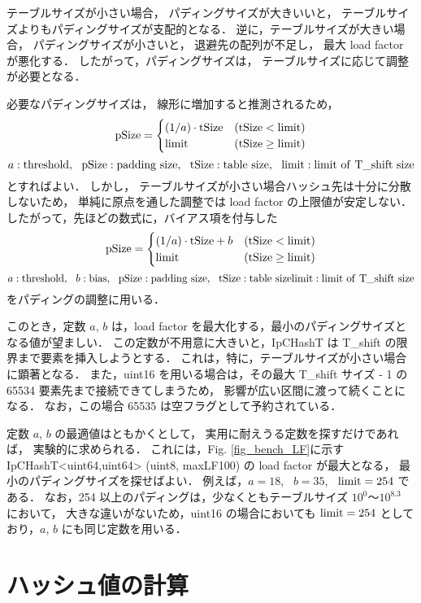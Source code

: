 テーブルサイズが小さい場合，
パディングサイズが大きいいと，
テーブルサイズよりもパディングサイズが支配的となる．
逆に，テーブルサイズが大きい場合，
パディングサイズが小さいと，
退避先の配列が不足し，
最大 load factor が悪化する．
したがって，パディングサイズは，
テーブルサイズに応じて調整が必要となる．

必要なパディングサイズは，
線形に増加すると推測されるため，
\[
  {\rm pSize} = \begin{cases}
    (1/a) \cdot {\rm tSize} & ({\rm tSize}<{\rm limit}) \\
    {\rm limit}    & ({\rm tSize}\geq{\rm limit})
  \end{cases}
\]
\[
  a: {\rm threshold}, \ \ 
  {\rm pSize}: {\rm padding \ size}, \ \ 
  {\rm tSize}: {\rm table \ size}, \ \ 
  {\rm limit}: {\rm limit \ of \ T\_shift \ size}
\]
とすればよい．
しかし，
テーブルサイズが小さい場合ハッシュ先は十分に分散しないため，
単純に原点を通した調整では load factor の上限値が安定しない．
したがって，先ほどの数式に，バイアス項を付与した
\[
  {\rm pSize} = \begin{cases}
    (1/a) \cdot {\rm tSize} + b & ({\rm tSize}<{\rm limit}) \\
    {\rm limit}    & ({\rm tSize}\geq{\rm limit})
  \end{cases}
\]
\[
  a: {\rm threshold}, \ \ 
  b: {\rm bias}, \ \ 
  {\rm pSize}: {\rm padding \ size}, \ \ 
  {\rm tSize}: {\rm table \ size}
  {\rm limit}: {\rm limit \ of \ T\_shift \ size}
\]
をパディングの調整に用いる．

このとき，定数 $a$, $b$ は，load factor を最大化する，最小のパディングサイズとなる値が望ましい．
この定数が不用意に大きいと，IpCHashT は T\_shift の限界まで要素を挿入しようとする．
これは，特に，テーブルサイズが小さい場合に顕著となる．
また，uint16 を用いる場合は，その最大 T\_shift サイズ - 1 の 65534 要素先まで接続できてしまうため，
影響が広い区間に渡って続くことになる．
なお，この場合 65535 は空フラグとして予約されている．

定数 $a$, $b$ の最適値はともかくとして，
実用に耐えうる定数を探すだけであれば，
実験的に求められる．
これには，Fig. \ref{fig_bench_LF}に示す IpCHashT<uint64,uint64> (uint8, maxLF100) の load factor が最大となる，
最小のパディングサイズを探せばよい．
例えば，$a=18$, \ $b=35$, \ ${\rm limit}=254$ である．
なお，254 以上のパディングは，少なくともテーブルサイズ $10^0〜10^{8.3}$ において，
大きな違いがないため，uint16 の場合においても ${\rm limit}=254$ としており，$a$, $b$ にも同じ定数を用いる．


\section{ハッシュ値の計算}

